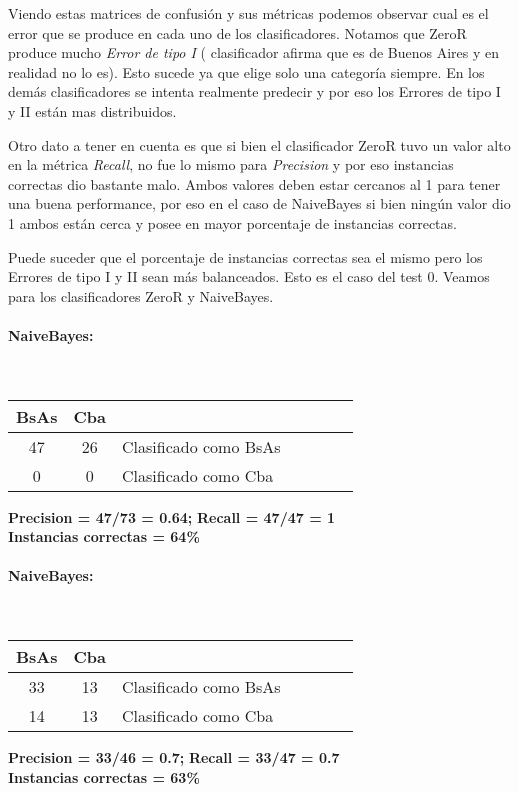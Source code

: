Viendo estas matrices de confusión y sus métricas podemos observar cual es el error que se produce en cada uno de los clasificadores. Notamos que ZeroR produce mucho \textit{Error de tipo I} ( clasificador afirma que es de Buenos Aires y en realidad no lo es). Esto sucede ya que elige solo una categoría siempre. En los demás clasificadores se intenta realmente  predecir y por eso los Errores de tipo I y II están mas distribuidos.

Otro dato a tener en cuenta es que si bien el clasificador ZeroR tuvo un valor alto en la métrica \textit{Recall}, no fue lo mismo para \textit{Precision} y por eso instancias correctas dio bastante malo. Ambos valores deben estar cercanos al 1 para tener una buena performance, por eso en el caso de NaiveBayes si bien ningún valor dio 1 ambos están cerca y posee en mayor porcentaje de instancias correctas.

Puede suceder que el porcentaje de instancias correctas sea el mismo pero los Errores de tipo I y II sean más balanceados. Esto es el caso del test 0. Veamos para los clasificadores ZeroR y NaiveBayes.

\paragraph*{NaiveBayes:}\mbox{}\\
\begin{table}[H]
\centering
\begin{tabular}{|c|c|l|c|c|c|c|}
\hline
 BsAs & Cba &  \\ \hline
 47 &  26 &  Clasificado como BsAs \\ \hline
 0 &  0 &  Clasificado como Cba \\ \hline
\end{tabular}
\end{table}
\begin{center}
\textbf{Precision = 47/73 = 0.64;} \textbf{Recall = 47/47 = 1}\\
\textbf{Instancias correctas = 64\%}
\end{center}

\paragraph*{NaiveBayes:}\mbox{}\\
\begin{table}[H]
\centering
\begin{tabular}{|c|c|l|c|c|c|c|}
\hline
 BsAs & Cba &  \\ \hline
 33 &  13 &  Clasificado como BsAs \\ \hline
 14 &  13 &  Clasificado como Cba \\ \hline
\end{tabular}
\end{table}
\begin{center}
\textbf{Precision = 33/46 = 0.7;} \textbf{Recall = 33/47 = 0.7}\\
\textbf{Instancias correctas = 63\%}
\end{center}

